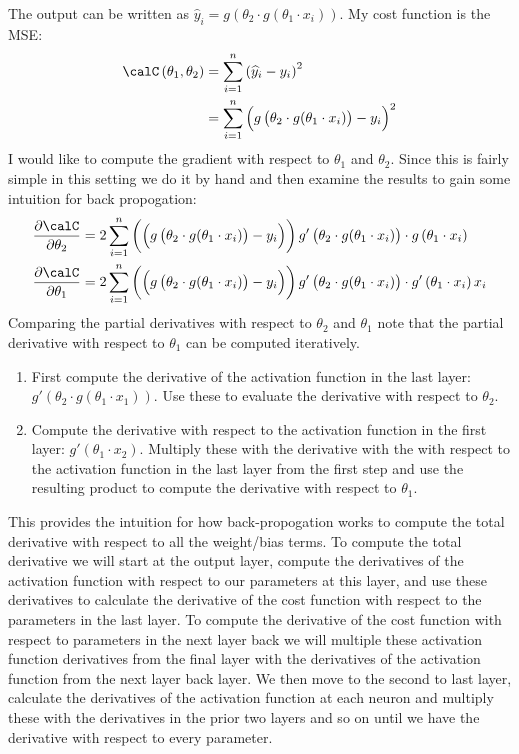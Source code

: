 \documentclass[10pt]{article}
\begin{document}
The output can be written as \(\widehat{y}_i = g\left(\theta_2\cdot g(\theta_1\cdot x_i)\right)\). My cost function is the MSE:
 \begin{align*}
	 \calC\left(\theta_1, \theta_2\right) &= \sum_{i=1}^n \left(\widehat{y}_i - y_i\right)^2 \\
										  &= \sum_{i=1}^n \left( g\left(\theta_2\cdot g(\theta_1\cdot x_i)\right)- y_i\right)^2
 \end{align*} 
I would like to compute the gradient with respect to \(\theta_1\) and  \(\theta_2\). Since this is fairly simple in this setting we do it by hand and then examine the results to gain some intuition for back propogation:
\begin{align*}
	\frac{\partial \calC}{\partial \theta_2} &= 2\sum_{i=1}^n \left(\left( g\left(\theta_2\cdot g(\theta_1\cdot x_i)\right)- y_i\right)\right)g'\left( \theta_2\cdot g(\theta_1\cdot x_i)\right)\cdot g\left(\theta_1\cdot x_i\right) \\
	\frac{\partial \calC}{\partial \theta_1} &= 2\sum_{i=1}^n \left(\left( g\left(\theta_2\cdot g(\theta_1\cdot x_i)\right)- y_i\right)\right)g'\left( \theta_2\cdot g(\theta_1\cdot x_i)\right)\cdot g'\left(\theta_1\cdot x_i\right)x_i 
\end{align*}
Comparing the partial derivatives with respect to \(\theta_2\) and  \(\theta_1\) note that the partial derivative with respect to  \(\theta_1\) can be computed iteratively. 
\begin{enumerate}
	\item First compute the derivative of the activation function in the last layer: \(g'\left(\theta_2\cdot g\left(\theta_1\cdot x_1\right)\right)\). Use these to evaluate the derivative with respect to \(\theta_2\).
	\item Compute the derivative with respect to the activation function in the first layer: \(g'\left(\theta_1 \cdot x_2\right)\). Multiply these with the derivative with the with respect to the activation function in the last layer from the first step and use the resulting product to compute the derivative with respect to \(\theta_1\).
\end{enumerate}
This provides the intuition for how back-propogation works to compute the total derivative with respect to all the weight/bias terms. To compute the total derivative we will start at the output layer, compute the derivatives of the activation function with respect to our parameters at this layer, and use these derivatives to calculate the derivative of the cost function with respect to the parameters in the last layer. To compute the derivative of the cost function with respect to parameters in the next layer back we will multiple these activation function derivatives from the final layer with the derivatives of the activation function from the next layer back layer. We then move to the second to last layer, calculate the derivatives of the activation function at each neuron and multiply these with the derivatives in the prior two layers and so on until we have the derivative with respect to every parameter.
\end{document}
